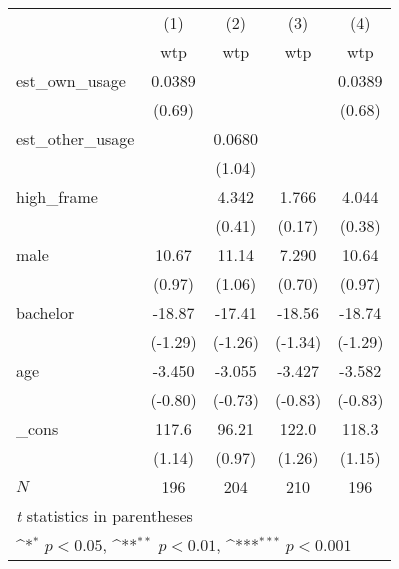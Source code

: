{
\def\sym#1{\ifmmode^{#1}\else\(^{#1}\)\fi}
\begin{tabular}{l*{4}{c}}
\hline\hline
          &\multicolumn{1}{c}{(1)}&\multicolumn{1}{c}{(2)}&\multicolumn{1}{c}{(3)}&\multicolumn{1}{c}{(4)}\\
          &\multicolumn{1}{c}{wtp}&\multicolumn{1}{c}{wtp}&\multicolumn{1}{c}{wtp}&\multicolumn{1}{c}{wtp}\\
\hline
est\_own\_usage&   0.0389         &                  &                  &   0.0389         \\
          &   (0.69)         &                  &                  &   (0.68)         \\
[1em]
est\_other\_usage&                  &   0.0680         &                  &                  \\
          &                  &   (1.04)         &                  &                  \\
[1em]
high\_frame&                  &    4.342         &    1.766         &    4.044         \\
          &                  &   (0.41)         &   (0.17)         &   (0.38)         \\
[1em]
male      &    10.67         &    11.14         &    7.290         &    10.64         \\
          &   (0.97)         &   (1.06)         &   (0.70)         &   (0.97)         \\
[1em]
bachelor  &   -18.87         &   -17.41         &   -18.56         &   -18.74         \\
          &  (-1.29)         &  (-1.26)         &  (-1.34)         &  (-1.29)         \\
[1em]
age       &   -3.450         &   -3.055         &   -3.427         &   -3.582         \\
          &  (-0.80)         &  (-0.73)         &  (-0.83)         &  (-0.83)         \\
[1em]
\_cons    &    117.6         &    96.21         &    122.0         &    118.3         \\
          &   (1.14)         &   (0.97)         &   (1.26)         &   (1.15)         \\
\hline
\(N\)     &      196         &      204         &      210         &      196         \\
\hline\hline
\multicolumn{5}{l}{\footnotesize \textit{t} statistics in parentheses}\\
\multicolumn{5}{l}{\footnotesize \sym{*} \(p<0.05\), \sym{**} \(p<0.01\), \sym{***} \(p<0.001\)}\\
\end{tabular}
}
